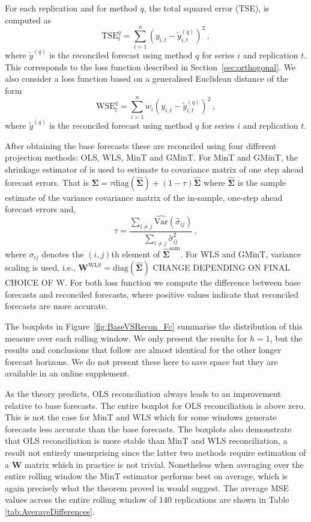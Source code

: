 \documentclass[12pt]{article}
\def\var{\text{Var}}
\theoremstyle{definition}
\begin{document}
{\color{blue} For each replication and for method $q$, the total squared error (TSE), is computed as
	\begin{equation}
	\label{eq:tse}
	\textrm{TSE}^{q}_t=\sum\limits_{i=1}^n(y_{i,t}-\tilde{y}^{(q)}_{i,t})^2\,,
	\end{equation}
	where $\tilde{y}^{(q)}$ is the reconciled forecast using method $q$ for series $i$ and replication $t$.
This corresponds to the loss function described in Section~\ref{sec:orthogonal}. We also consider a loss function based on a generalised Euclidean distance of the form
\begin{equation*}
	\textrm{WSE}^{q}_t=\sum\limits_{i=1}^n w_i (y_{i,t}-\tilde{y}^{(q)}_{i,t})^2\,,
	\end{equation*}
	where $\tilde{y}^{(q)}$ is the reconciled forecast using method $q$ for series $i$ and replication $t$.
}

After obtaining the base forecasts these are reconciled using four different projection methods: OLS,{\color{blue} WLS, MinT and GMinT.   For MinT and GMinT, the shrinkage estimator of \cite{Schafer2005} is used to estimate to covariance matrix of one step ahead forecast errors.  That is $\bm{\Sigma} = \tau\text{diag}(\hat{\bm{\Sigma}}) + (1-\tau)\hat{\bm{\Sigma}}$  where $\hat{\bm{\Sigma}}$ is the sample estimate of the variance covariance matrix of the in-sample, one-step ahead forecast errors and,
	\begin{equation*}
	\tau = \frac{\sum_{i \neq j}\hat{\var}(\hat{\sigma}_{ij})}{\sum_{i \neq j}{\hat{\sigma}}^2_{ij}}\,,
	\end{equation*}
	where $\sigma_{ij}$ denotes the $(i,j)$th element of $\hat{\bm{\Sigma}}^{\text{sam}}$.  For WLS and GMinT, variance scaling is used, i.e., $\bm{W}^{\text{WLS}}=\text{diag}(\hat{\bm{\Sigma}})$ CHANGE DEPENDING ON FINAL CHOICE OF W.  For both loss function} we compute the difference between base forecasts and reconciled forecasts, where positive values indicate that reconciled forecasts are more accurate. 

The boxplots in Figure~\ref{fig:BaseVSRecon_Fc} summarise the distribution of this measure over each rolling window. We only present the results for $h=1$, but the results and conclusions that follow are almost identical for the other longer forecast horizons. We do not present these here to save space but they are available {\color{blue} in an online supplement.}

As the theory predicts, OLS reconciliation always leads to an improvement relative to base forecasts. The entire boxplot for OLS reconciliation is above zero. This is not the case for MinT and WLS which for some windows generate forecasts less accurate than the base forecasts. The boxplots also demonstrate that OLS reconciliation is more stable than MinT and WLS reconciliation, a result not entirely unsurprising since the latter two methods require estimation of a $\bm{W}$ matrix which in practice is not trivial. Nonetheless when averaging over the entire rolling window the MinT estimator performs best on average, which is again precisely what the theorem proved in \citet{WicEtAl2019} would suggest. The average MSE values across the entire rolling window of 140 replications are shown in Table \ref{tab:AveraveDifferences}.
\end{document}
